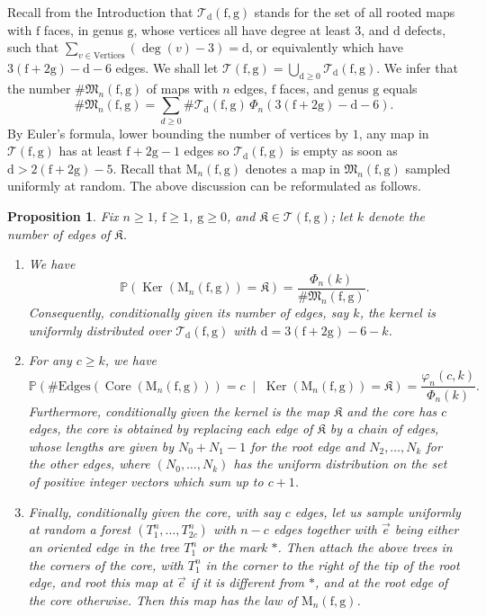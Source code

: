 \documentclass[JEP,XML,SOM,Unicode,NoFloatCountersInSection,NoEqCountersInSection]{cedram}
\theoremstyle{plain}
\newtheorem{proposition}[theorem]{Proposition}
\theoremstyle{definition}
\theoremstyle{remark}
\renewcommand{\P}{\mathbb{P}}
\newcommand{\Map}{\mathrm{M}}
\newcommand{\face}{\mathrm{f}}
\newcommand{\defect}{\mathrm{d}}
\newcommand{\gen}{\mathrm{g}}
\DeclareMathOperator{\Core}{Core}
\DeclareMathOperator{\Ker}{Ker}
\newcommand{\kernel}{\mathfrak{K}}
\begin{document}
Recall from the Introduction that
$\mathcal{T}_{\defect}(\face,\gen)$ stands for the set of all rooted maps with $ \face$ faces, in genus $ \gen$, whose vertices all have degree at least $3$, and $\defect$ defects, \ie such that $\sum_{v \in \mathrm{Vertices}} (\deg(v)-3) = \defect$, or equivalently which have $3(\face+2\gen) - \defect - 6$ edges.
We shall let $\mathcal{T}(\face,\gen) = \bigcup_{\defect \ge 0} \mathcal{T}_{\defect}(\face,\gen)$.
We infer that the number $\#\mathfrak{M}_n(\face,\gen)$ of maps with $n$ edges, $\face$ faces, and genus $\gen$ equals
\[
\#\mathfrak{M}_n(\face,\gen) = \sum_{d \ge 0} \# \mathcal{T}_{\defect}(\face,\gen)\, \Phi_n(3(\face+2\gen) - \defect - 6).
\]
By Euler's formula, lower bounding the number of vertices by $1$, any map in $\mathcal{T}(\face,\gen)$ has at least $\face+2\gen-1$ edges so $\mathcal{T}_{\defect}(\face,\gen)$ is empty as soon as $\defect > 2(\face+2\gen)-5$.
Recall that $\Map_{n}(\face,\gen)$ denotes a map in $\mathfrak{M}_n(\face,\gen)$ sampled uniformly at random.
The above discussion can be reformulated as follows.

\begin{proposition}\label{prop:loi_core_kernel}
Fix $n\ge1$, $\face \geq 1$, $\gen\ge0$, and $\kernel \in \mathcal{T}(\face,\gen)$; let $k$ denote the number of edges of $\kernel$.
\begin{enumerate}
\item We have
\[
\P \left(\Ker(\Map_n(\face,\gen)) = \kernel \right) = \frac{\Phi_{n}(k)}{\# \mathfrak{M}_n(\face,\gen)}.
\]
Consequently, conditionally given its number of edges, say
$k$, the kernel is uniformly distributed over $\mathcal{T}_\defect(\face,\gen)$ with $\defect=3(\face+2\gen)-6-k$.

\item For any $c \geq k$, we have
\[
\P \left(\#\mathrm{Edges}(\Core(\Map_n(\face,\gen))) = c \;\middle|\; \Ker(\Map_n(\face,\gen)) = \kernel \right) = \frac{\varphi_{n}(c,k)}{\Phi_{n}(k)}.
\]
Furthermore, conditionally given
the kernel is the map $\kernel$ and the core has $c$ edges, the core is obtained by replacing each edge of $\kernel$ by a chain of edges,
whose lengths are given by $N_0+N_1-1$ for the root edge and $N_2, \dots, N_k$ for the other edges, where $(N_0, \dots, N_k)$ has the uniform distribution on the set of positive integer vectors which sum up to $c+1$.

\item Finally, conditionally given the core, with say $c$ edges, let us sample uniformly at random a forest $(T^n_{1}, \dots, T^n_{2c})$ with $n-c$ edges together with $\vec{e}$ being either an oriented edge in the tree $T^n_1$ or the mark $\ast$.
Then attach the above trees in the corners of the core, with $T^n_1$ in the corner to the right of the tip of the root edge, and root this map at $\vec{e}$ if it is different from $\ast$, and at the root edge of the core otherwise. Then this map has the law of $\Map_n(\face,\gen)$.
\end{enumerate}
\end{proposition}
\end{document}
